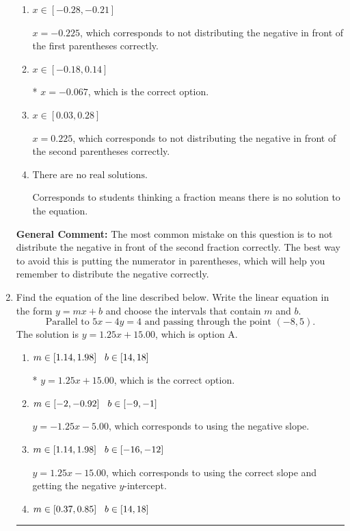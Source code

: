 \documentclass{extbook}[14pt]
\newcommand{\litem}[1]{\item #1

\rule{\textwidth}{0.4pt}}
\begin{document}
\begin{enumerate}
{\begin{enumerate}[label=\Alph*.]
$x = 0.655$, which corresponds to getting the negative of the actual solution.
\item \( x \in [-0.28, -0.21] \)

$x = -0.225$, which corresponds to not distributing the negative in front of the first parentheses correctly.
\item \( x \in [-0.18, 0.14] \)

* $x = -0.067$, which is the correct option.
\item \( x \in [0.03, 0.28] \)

$x = 0.225$, which corresponds to not distributing the negative in front of the second parentheses correctly.
\item \( \text{There are no real solutions.} \)

Corresponds to students thinking a fraction means there is no solution to the equation.
\end{enumerate}

\textbf{General Comment:} The most common mistake on this question is to not distribute the negative in front of the second fraction correctly. The best way to avoid this is putting the numerator in parentheses, which will help you remember to distribute the negative correctly.
}
\litem{
Find the equation of the line described below. Write the linear equation in the form $ y=mx+b $ and choose the intervals that contain $m$ and $b$.
\[ \text{Parallel to } 5 x - 4 y = 4 \text{ and passing through the point } (-8, 5). \]The solution is \( y = 1.25x + 15.00 \), which is option A.\begin{enumerate}[label=\Alph*.]
\item \( m \in [1.14, 1.98] \hspace*{3mm} b \in [14, 18] \)

* $y = 1.25x + 15.00$, which is the correct option.
\item \( m \in [-2, -0.92] \hspace*{3mm} b \in [-9, -1] \)

 $y = -1.25x - 5.00$, which corresponds to using the negative slope.
\item \( m \in [1.14, 1.98] \hspace*{3mm} b \in [-16, -12] \)

 $y = 1.25x - 15.00$, which corresponds to using the correct slope and getting the negative $y$-intercept.
\item \( m \in [0.37, 0.85] \hspace*{3mm} b \in [14, 18] \)


\end{enumerate}}
\end{enumerate}
\end{document}
